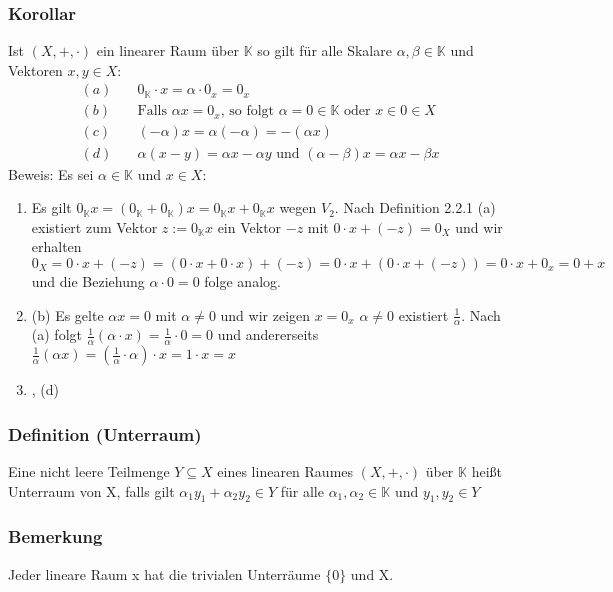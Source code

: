 \subsubsection{Korollar}
Ist $(X,+,\cdot )$ ein linearer Raum über $\mathbb{K}$ so gilt für alle Skalare $\alpha ,\beta \in\mathbb{K}$ und Vektoren $x,y\in X$:
\begin{align*}
(a)\quad& 0_{\mathbb{K}} \cdot x = \alpha \cdot 0_x = 0_x\\
(b)\quad& \text{Falls }\alpha x = 0_x\text{, so folgt } \alpha = 0\in\mathbb{K} \text{ oder } x\in 0 \in X \\
(c)\quad& (-\alpha )x = \alpha (-\alpha )=-(\alpha x)\\
(d)\quad& \alpha (x-y) = \alpha x - \alpha y \text{ und } (\alpha - \beta )x = \alpha x - \beta x
\end{align*}
Beweis: Es sei $\alpha \in \mathbb{K}$ und $x\in X$:
\renewcommand{\labelenumi}{(\alph{enumi})}
\begin{enumerate}
\item Es gilt $0_{\mathbb{K}} x = (0_{\mathbb{K}}+0_{\mathbb{K}})x = 0_{\mathbb{K}}x + 0_{\mathbb{K}}x$ wegen $V_2$. Nach Definition 2.2.1 (a) existiert zum Vektor $z:=0_{\mathbb{K}} x$ ein Vektor $-z$ mit $0\cdot x + (-z)=0_X$ und wir erhalten $0_X=0\cdot x + (-z) = (0\cdot x + 0\cdot x)+(-z) = 0\cdot x +(0\cdot x + (-z)) = 0\cdot x + 0_x = 0+x$ und die Beziehung $\alpha \cdot 0 = 0$ folge analog.
\item (b) Es gelte $\alpha x = 0$ mit $\alpha \neq 0$ und wir zeigen $x=0_x$ $\alpha \neq 0$ existiert $\frac{1}{\alpha}$. Nach (a) folgt ${\frac{1}{\alpha}} (\alpha \cdot x) = \frac{1}{\alpha} \cdot 0=0$ und andererseits $\frac{1}{\alpha} (\alpha x) = (\frac{1}{\alpha} \cdot \alpha) \cdot x=1\cdot x = x$
\item , (d)
\end{enumerate}
\subsubsection{Definition (Unterraum)}
Eine nicht leere Teilmenge $Y \subseteq X$ eines linearen Raumes $(X,+,\cdot)$ über $\mathbb{K}$ heißt Unterraum von X, falls gilt $\alpha_1 y_1 + \alpha_2 y_2 \in Y$ für alle $\alpha_1, \alpha_2\in\mathbb{K}$ und $y_1, y_2\in Y$
\subsubsection{Bemerkung}
Jeder lineare Raum x hat die trivialen Unterräume $\{0\}$ und X.
